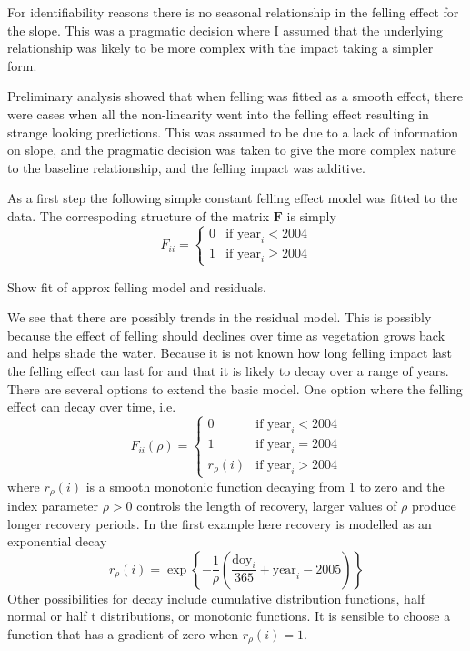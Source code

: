 For identifiability reasons there is no seasonal relationship in the felling effect for the slope.  This was a pragmatic decision where I assumed that the underlying relationship was likely to be more complex with the impact taking a simpler form.

Preliminary analysis showed that when felling was fitted as a smooth effect, there were cases when all the non-linearity went into the felling effect resulting in strange looking predictions.  This was assumed to be due to a lack of information on slope, and the pragmatic decision was taken to give the more complex nature to the baseline relationship, and the felling impact was additive.

As a first step the following simple constant felling effect model was fitted to the data. The correspoding structure of the matrix $\bm{F}$ is simply
\begin{equation}
F_{ii} =
  \begin{cases}
   0 & \text{if } \text{year}_i < 2004 \\
   1 & \text{if } \text{year}_i \geq 2004 
  \end{cases}
\end{equation}

Show fit of approx felling model and residuals.

We see that there are possibly trends in the residual model.  This is possibly because the effect of felling should declines over time as vegetation grows back and helps shade the water.  Because it is not known how long felling impact last the felling effect can last for and that it is likely to decay over a range of years. There are several options to extend the basic model.  One option where the felling effect can decay over time, i.e.
\begin{equation}
  F_{ii}(\rho) = 
    \begin{cases}
      0    & \text{if } \text{year}_i < 2004 \\
      1    & \text{if } \text{year}_i = 2004 \\
      r_\rho(i) & \text{if } \text{year}_i > 2004
  \end{cases}
\end{equation}
where $r_\rho(i)$ is a smooth monotonic function decaying from 1 to zero and the index parameter $\rho > 0$ controls the length of recovery, larger values of $\rho$ produce longer recovery periods.  In the first example here recovery is modelled as an exponential decay
\begin{equation}
  r_\rho(i) = \exp\left\{ - \dfrac{1}{\rho} \left(\dfrac{\text{doy}_i}{365} + \text{year}_i - 2005\right)\right\}
\end{equation}
Other possibilities for decay include cumulative distribution functions, half normal or half t distributions, or monotonic functions.  It is sensible to choose a function that has a gradient of zero when $r_\rho(i) = 1$.  

